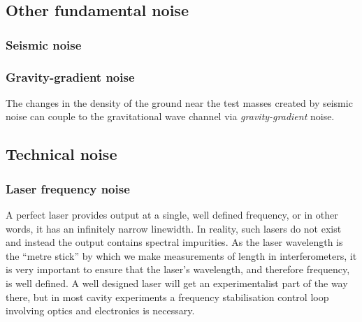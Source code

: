 \subsection{Other fundamental noise}

\subsubsection{Seismic noise}

\subsubsection{Gravity-gradient noise}

The changes in the density of the ground near the test masses created by seismic noise can couple to the gravitational wave channel via \emph{gravity-gradient} noise.



\subsection{Technical noise}

\subsubsection{Laser frequency noise}
A perfect laser provides output at a single, well defined frequency, or in other words, it has an infinitely narrow linewidth. In reality, such lasers do not exist and instead the output contains spectral impurities. As the laser wavelength is the ``metre stick'' by which we make measurements of length in interferometers, it is very important to ensure that the laser's wavelength, and therefore frequency, is well defined. A well designed laser will get an experimentalist part of the way there, but in most cavity experiments a frequency stabilisation control loop involving optics and electronics is necessary.


